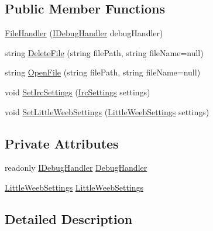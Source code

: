 \subsection*{Public Member Functions}
\begin{DoxyCompactItemize}
\item 
\mbox{\hyperlink{class_little_weeb_library_1_1_handlers_1_1_file_handler_a2cc256d20ab33e0838e50279ee9f6fc0}{File\+Handler}} (\mbox{\hyperlink{interface_little_weeb_library_1_1_handlers_1_1_i_debug_handler}{I\+Debug\+Handler}} debug\+Handler)
\item 
string \mbox{\hyperlink{class_little_weeb_library_1_1_handlers_1_1_file_handler_ae1b342c4d821543a0a3400e4e0c95903}{Delete\+File}} (string file\+Path, string file\+Name=null)
\item 
string \mbox{\hyperlink{class_little_weeb_library_1_1_handlers_1_1_file_handler_a08cbef4974d973035a7ddeedb9f8ff4a}{Open\+File}} (string file\+Path, string file\+Name=null)
\item 
void \mbox{\hyperlink{class_little_weeb_library_1_1_handlers_1_1_file_handler_a4ccfd9a9698ca0dc9e228aabe27ac756}{Set\+Irc\+Settings}} (\mbox{\hyperlink{class_little_weeb_library_1_1_settings_1_1_irc_settings}{Irc\+Settings}} settings)
\item 
void \mbox{\hyperlink{class_little_weeb_library_1_1_handlers_1_1_file_handler_a81ebb3e28e77c5fc30acaf7d769ba8df}{Set\+Little\+Weeb\+Settings}} (\mbox{\hyperlink{class_little_weeb_library_1_1_settings_1_1_little_weeb_settings}{Little\+Weeb\+Settings}} settings)
\end{DoxyCompactItemize}
\subsection*{Private Attributes}
\begin{DoxyCompactItemize}
\item 
readonly \mbox{\hyperlink{interface_little_weeb_library_1_1_handlers_1_1_i_debug_handler}{I\+Debug\+Handler}} \mbox{\hyperlink{class_little_weeb_library_1_1_handlers_1_1_file_handler_a131760e1828cd7ae1df2e90e9f300426}{Debug\+Handler}}
\item 
\mbox{\hyperlink{class_little_weeb_library_1_1_settings_1_1_little_weeb_settings}{Little\+Weeb\+Settings}} \mbox{\hyperlink{class_little_weeb_library_1_1_handlers_1_1_file_handler_aba666088c6ab88513663dfc7bbb45bf1}{Little\+Weeb\+Settings}}
\end{DoxyCompactItemize}


\subsection{Detailed Description}


